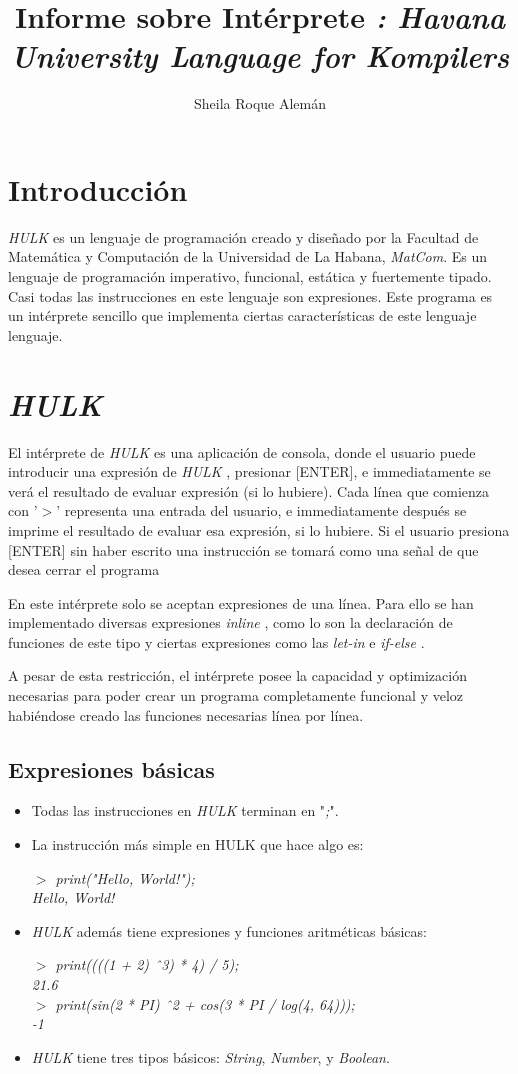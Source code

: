 \documentclass[12pt]{article}
\title{Informe sobre Intérprete \hulk \emph{: Havana University Language for Kompilers}}
\author{Sheila Roque Alemán}
\date{ }
\newcommand{\hulk}{\emph{HULK} }
\newcommand{\ini}{$>$ }
\newcommand{\inline}{\textit{inline} }
\newcommand{\letin}{\textit{let-in} }
\newcommand{\ifelse}{\textit{if-else} }
\begin{document}
\maketitle

\section*{Introducción}
	\hulk es un lenguaje de programación creado y diseñado por la Facultad de Matemática y Computación de la Universidad de La Habana, \emph{MatCom}.
	Es un lenguaje de programación imperativo, funcional, estática y fuertemente tipado.
	Casi todas las instrucciones en este lenguaje son expresiones.
	Este programa es un intérprete sencillo que implementa ciertas características de este lenguaje lenguaje.
	
\section*{\hulk}
	El intérprete de \hulk es una aplicación de consola, donde el usuario puede introducir una expresión de \hulk, presionar [ENTER], e immediatamente se verá el resultado de evaluar expresión (si lo hubiere).
	Cada línea que comienza con '$>$' representa una entrada del usuario, e immediatamente después se imprime el resultado de evaluar esa expresión, si lo hubiere.
	Si el usuario presiona [ENTER] sin haber escrito una instrucción se tomará como una señal de que desea cerrar el programa

	En este intérprete solo se aceptan expresiones de una línea.
	Para ello se han implementado diversas expresiones \inline , como lo son la declaración de funciones de este tipo y ciertas expresiones como las \letin e \ifelse.
	
	A pesar de esta restricción, el intérprete posee la capacidad y optimización necesarias para poder crear un programa completamente funcional y veloz habiéndose creado las funciones necesarias línea por línea.
	
\subsection*{Expresiones básicas}
\begin{itemize}
	\item Todas las instrucciones en \hulk terminan en "\textit{;}".
	\item La instrucción más simple en HULK que hace algo es:
	
	\emph{
	\ini print("Hello, World!"); \\
	Hello, World!
	}
	\item \hulk además tiene expresiones y funciones aritméticas básicas:
	
	\emph{
	\ini print((((1 + 2) \^\ 3) * 4) / 5); \\
	21.6 \\
	\ini print(sin(2 * PI) \^\ 2 + cos(3 * PI / log(4, 64))); \\
	-1
	}
	\item \hulk tiene tres tipos básicos: \emph{String}, \emph{Number}, y \emph{Boolean}.
\end{itemize}
\end{document}
